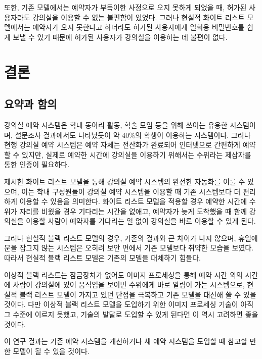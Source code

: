 \documentclass[11pt,a4paper]{article}
\begin{document}
또한, 기존 모델에서는 예약자가 부득이한 사정으로 오지 못하게 되었을 때, 허가된
사용자라도 강의실을 이용할 수 없는 불편함이 있었다. 그러나 현실적 화이트 리스트
모델에서는 예약자가 오지 못한다고 하더라도 허가된 사용자에게 일회용 비밀번호를
쉽게 보낼 수 있기 때문에 허가된 사용자가 강의실을 이용하는 데 불편이 없다.

\section{결론}

\subsection{요약과 함의}
강의실 예약 시스템은 학내 동아리 활동, 학술 모임 등을 위해 쓰이는 유용한
시스템이며, 설문조사 결과에서도 나타났듯이 약 40\%의 학생이 이용하는
시스템이다. 그러나 현행 강의실 예약 시스템은 예약 자체는 전산화가 완료되어
인터넷으로 간편하게 예약할 수 있지만, 실제로 예약한 시간에 강의실을 이용하기
위해서는 수위라는 제삼자를 통한 인증이 필요하다.

제시한 화이트 리스트 모델을 통해 강의실 예약 시스템의 완전한 자동화를 이룰 수
있으며, 이는 학내 구성원들이 강의실 예약 시스템을 이용할 때 기존 시스템보다 더
편리하게 이용할 수 있음을 의미한다. 화이트 리스트 모델을 적용할 경우 예약한
시간에 수위가 자리를 비웠을 경우 기다리는 시간을 없애고, 예약자가 늦게 도착했을
때 함께 강의실을 이용할 사람이 예약자를 기다리는 일 없이 강의실을 바로 이용할
수 있게 된다.

그러나 현실적 블랙 리스트 모델의 경우, 기존의 결과와 큰 차이가 나지 않으며,
휴일에 문을 잠그지 않는 시스템은 오히려 보안 면에서 기존 모델보다 취약한 모습을
보였다. 따라서 현실적 블랙 리스트 모델은 기존의 모델을 대체하기 힘들다.

이상적 블랙 리스트는 잠금장치가 없어도 이미지 프로세싱을 통해 예약 시간 외의
시간에 사람이 강의실에 있어 움직임을 보이면 수위에게 바로 알림이 가는
시스템으로, 현실적 블랙 리스트 모델이 가지고 있던 단점을 극복하고 기존 모델을
대신해 쓸 수 있을 것이다. 다만 이상적 블랙 리스트 모델을 도입하기 위한 이미지
프로세싱 기술이 아직 그 수준에 이르지 못했고, 기술의 발달로 도입할 수 있게
된다면 이 역시 고려하면 좋을 것이다.

이 연구 결과는 기존 예약 시스템을 개선하거나 새 예약 시스템을 도입할 때 참고할
만한 모델이 될 수 있을 것이다.
\end{document}
